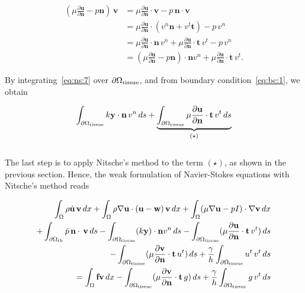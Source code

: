 \documentclass[11pt,a4paper,titlepage]{report}
\begin{document}
\begin{align}
(\mu \frac{\partial \mathbf{u}}{\partial \mathbf{n}} -  p \mathbf{n}) \, \mathbf{v}
& = \mu \frac{\partial \mathbf{u}}{\partial \mathbf{n}} \cdot \mathbf{v} - p \, \mathbf{n} \cdot \mathbf{v} \\
& = \mu \frac{\partial \mathbf{u}}{\partial \mathbf{n}} \cdot (v^n \mathbf{n} + v^t \mathbf{t}) - p \, v^n \\
& = \mu \frac{\partial \mathbf{u}}{\partial \mathbf{n}} \cdot \mathbf{n} \, v^n + \mu \frac{\partial \mathbf{u}}{\partial \mathbf{n}} \cdot \mathbf{t} \, v^t   - p \, v^n \\
\label{eq:ns:7}
& = (\mu \frac{\partial \mathbf{u}}{\partial \mathbf{n}} - p\mathbf{n}) \cdot \mathbf{n} v^n + \mu \frac{\partial \mathbf{u}}{\partial \mathbf{n}} \cdot \mathbf{t} \, v^t. 
\end{align}

By integrating~\eqref{eq:ns:7} over $\partial \Omega_{\rm tissue}$, and from boundary condition~\eqref{eq:bc:1}, we obtain

\begin{equation}
\int_{\partial \Omega_{\rm tissue}} k \mathbf{y} \cdot \mathbf{n} \, v^n \, ds 
+ \underbrace{ \int_{\partial \Omega_{\rm tissue}} \mu \frac{\partial \mathbf{u}}{\partial \mathbf{n}} \cdot \mathbf{t} \, v^t \, ds }_{(\star)}
\end{equation}
\\
The last step is to apply Nitsche's method to the term $(\star)$, as shown in the previous section. Hence, the weak formulation of Navier-Stokes equations with Nitsche's method reads

\begin{equation}
\begin{split}
\label{eq:nitsche:6}
 \int_{\Omega} \rho \dot{\mathbf{u}} \, \mathbf{v} \, dx
+ \int_{\Omega} \rho \nabla \mathbf{u} \cdot (\mathbf{u} - \mathbf{w}) \, \mathbf{v} \, dx
+ \int_{\Omega} (\mu \nabla \mathbf{u} - pI) \cdot \nabla \mathbf{v} \, dx \\
+ \int_{\partial \Omega_{\rm tb}} \bar{p} \, \mathbf{n} \cdot \, \mathbf{v} \, ds  %
- \int_{\partial \Omega_{\rm tissue}} (k \mathbf{y}) \cdot \mathbf{n} v^n \, ds 
- \int_{\partial \Omega_{\rm tissue}} (\mu \frac{\partial \mathbf{u}}{\partial \mathbf{n}} \cdot \mathbf{t} \, v^t) \, ds \\
- \int_{\partial \Omega_{\rm tissue}} (\mu \frac{\partial \mathbf{v}}{\partial \mathbf{n}} \cdot \mathbf{t} \, u^t) \, ds
+ \frac{\gamma}{h} \int_{\partial \Omega_{\rm tissue}} u^t \, v^t \, ds \\
= \int_{\Omega} \mathbf{f} \mathbf{v} \, dx
- \int_{\partial \Omega_{\rm tissue}} (\mu \frac{\partial \mathbf{v}}{\partial \mathbf{n}} \cdot \mathbf{t} \, g) \, ds 
+ \frac{\gamma}{h} \int_{\partial \Omega_{\rm tissue}} g \, v^t \, ds
\end{split}
\end{equation}
\end{document}
